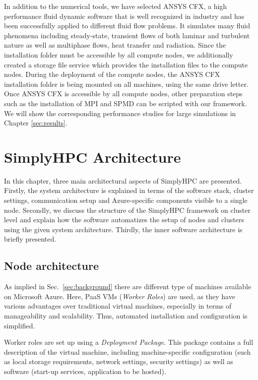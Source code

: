 \documentclass[3p,times]{elsarticle}
\begin{document}
In addition to the numerical tools, we have selected ANSYS CFX, a high performance fluid dynamic software that is well recognized in industry and has been successfully applied to different fluid flow problems. It simulates many fluid phenomena including steady-state, transient flows of both laminar and turbulent nature as well as multiphase flows, heat transfer and radiation. Since the installation folder must be accessible by all compute nodes, we additionally created a storage file service which provides the installation files to the compute nodes. During the deployment of the compute nodes, the ANSYS CFX installation folder is being mounted on all machines, using the same drive letter. Once ANSYS CFX is accessible by all compute nodes, other preparation steps such as the installation of MPI and SPMD can be scripted with our framework. We will show the corresponding performance studies for large simulations in Chapter \ref{sec:results}.

\section{SimplyHPC Architecture}
\label{sec:architecture}
In this chapter, three main architectural aspects of SimplyHPC are presented. Firstly, the system architecture is explained in terms of the software stack, cluster settings, communication setup and Azure-specific components visible to a single node. Secondly, we discuss the structure of the SimplyHPC framework on cluster level and explain how the software automatizes the setup of nodes and clusters using the given system architecture. Thirdly, the inner software architecture is briefly presented.

\subsection{Node architecture}

As implied in Sec.~\ref{sec:background} there are different type of machines available on Microsoft Azure. Here, PaaS VMs (\textit{Worker Roles}) are used, as they have various advantages over traditional virtual machines, especially in terms of manageability and scalability. Thus, automated installation and configuration is simplified. 

Worker roles are set up using a \textit{Deployment Package}. This package contains a full description of the  virtual machine, including machine-specific configuration (such as local storage requirements, network settings, security settings) as well as software (start-up services, application to be hosted).
\end{document}
